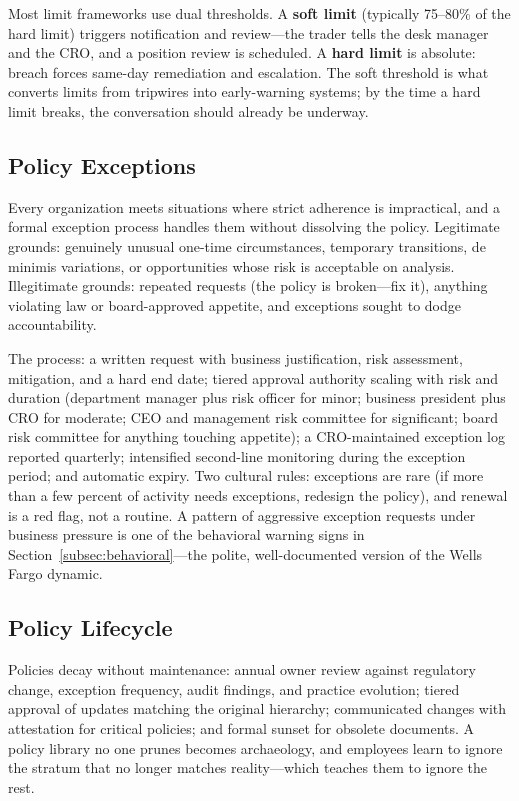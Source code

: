 \documentclass[11pt,openany]{book}
\begin{document}
Most limit frameworks use dual thresholds. A \textbf{soft limit} (typically
75--80\% of the hard limit) triggers notification and review---the trader
tells the desk manager and the CRO, and a position review is scheduled. A
\textbf{hard limit} is absolute: breach forces same-day remediation and
escalation. The soft threshold is what converts limits from tripwires into
early-warning systems; by the time a hard limit breaks, the conversation
should already be underway.

\subsection{Policy Exceptions}

Every organization meets situations where strict adherence is impractical,
and a formal exception process handles them without dissolving the policy.
Legitimate grounds: genuinely unusual one-time circumstances, temporary
transitions, de minimis variations, or opportunities whose risk is acceptable
on analysis. Illegitimate grounds: repeated requests (the policy is
broken---fix it), anything violating law or board-approved appetite, and
exceptions sought to dodge accountability.

The process: a written request with business justification, risk assessment,
mitigation, and a hard end date; tiered approval authority scaling with risk
and duration (department manager plus risk officer for minor; business
president plus CRO for moderate; CEO and management risk committee for
significant; board risk committee for anything touching appetite); a
CRO-maintained exception log reported quarterly; intensified second-line
monitoring during the exception period; and automatic expiry. Two cultural
rules: exceptions are rare (if more than a few percent of activity needs
exceptions, redesign the policy), and renewal is a red flag, not a routine. A
pattern of aggressive exception requests under business pressure is one of
the behavioral warning signs in Section~\ref{subsec:behavioral}---the polite,
well-documented version of the Wells Fargo dynamic.

\subsection{Policy Lifecycle}

Policies decay without maintenance: annual owner review against regulatory
change, exception frequency, audit findings, and practice evolution; tiered
approval of updates matching the original hierarchy; communicated changes
with attestation for critical policies; and formal sunset for obsolete
documents. A policy library no one prunes becomes archaeology, and employees
learn to ignore the stratum that no longer matches reality---which teaches
them to ignore the rest.
\end{document}
